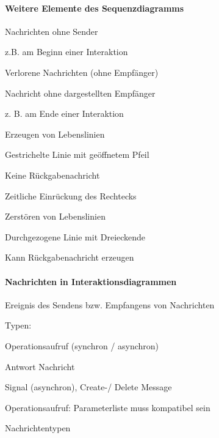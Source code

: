 \documentclass[a4paper]{article}
\begin{document}
\begin{multicols}{3}
  \paragraph{Weitere Elemente des Sequenzdiagramms}
  \begin{itemize*}
    \item Nachrichten ohne Sender
          \begin{itemize*}
            \item z.B. am Beginn einer Interaktion
          \end{itemize*}
    \item Verlorene Nachrichten (ohne Empfänger)
          \begin{itemize*}
            \item Nachricht ohne dargestellten Empfänger
            \item z. B. am Ende einer Interaktion
          \end{itemize*}
    \item Erzeugen von Lebenslinien
          \begin{itemize*}
            \item Gestrichelte Linie mit geöffnetem Pfeil
            \item Keine Rückgabenachricht
            \item Zeitliche Einrückung des Rechtecks
          \end{itemize*}
    \item Zerstören von Lebenslinien
          \begin{itemize*}
            \item Durchgezogene Linie mit Dreieckende
            \item Kann Rückgabenachricht erzeugen
          \end{itemize*}
  \end{itemize*}

  \paragraph{Nachrichten in Interaktionsdiagrammen}
  \begin{itemize*}
    \item Ereignis des Sendens bzw. Empfangens von Nachrichten
    \item Typen:
          \begin{itemize*}
            \item Operationsaufruf (synchron / asynchron)
            \item Antwort Nachricht
            \item Signal (asynchron), Create-/ Delete Message
          \end{itemize*}
    \item Operationsaufruf: Parameterliste muss kompatibel sein
    \item Nachrichtentypen
  \end{itemize*}


\end{multicols}
\end{document}
